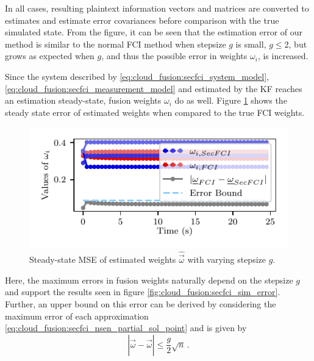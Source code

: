  In all cases, resulting plaintext information vectors and matrices are converted to estimates and estimate error covariances before comparison with the true simulated state. From the figure, it can be seen that the estimation error of our method is similar to the normal FCI method when stepsize $g$ is small, $g\leq 2$, but grows as expected when $g$, and thus the possible error in weights $\omega_i$, is increased.

Since the system described by \eqref{eq:cloud_fusion:secfci_system_model}, \eqref{eq:cloud_fusion:secfci_measurement_model} and estimated by the KF reaches an estimation steady-state, fusion weights $\omega_i$ do as well. Figure \ref{fig:cloud_fusion:secfci_omega_error} shows the steady state error of estimated weights when compared to the true FCI weights. 
\begin{figure}[htbp]
    \centering
    \includegraphics{figures/omegas_cmp.pdf}
    \caption{Steady-state MSE of estimated weights $\hat{\vec{\omega}}$ with varying stepsize $g$.}
    \label{fig:cloud_fusion:secfci_omega_error}
\end{figure}
Here, the maximum errors in fusion weights naturally depend on the stepsize $g$ and support the results seen in figure \ref{fig:cloud_fusion:secfci_sim_error}. Further, an upper bound on this error can be derived by considering the maximum error of each approximation \eqref{eq:cloud_fusion:secfci_nsen_partial_sol_point} and is given by
\begin{equation}
    \left|\hat{\vec{\omega}} - \vec{\omega}\right| \leq \frac{g}{2}\sqrt{n}\,.
\end{equation}

